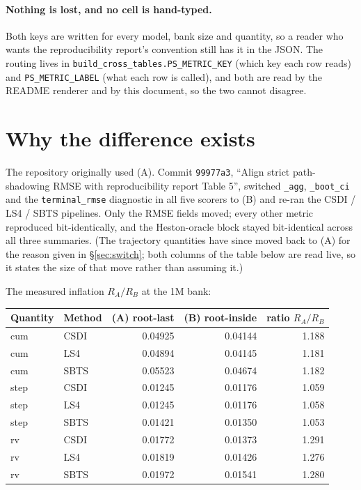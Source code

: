 \documentclass[11pt,a4paper]{article}
\begin{document}
\paragraph{Nothing is lost, and no cell is hand-typed.} Both keys are written for
every model, bank size and quantity, so a reader who wants the reproducibility
report's convention still has it in the JSON. The routing lives in
\texttt{build\_cross\_tables.PS\_METRIC\_KEY} (which key each row reads) and
\texttt{PS\_METRIC\_LABEL} (what each row is called), and both are read by the
README renderer and by this document, so the two cannot disagree.


\section{Why the difference exists}

The repository originally used (A). Commit \texttt{99977a3}, ``Align strict
path-shadowing RMSE with reproducibility report Table 5'', switched
\texttt{\_agg}, \texttt{\_boot\_ci} and the \texttt{terminal\_rmse} diagnostic
in all five scorers to (B) and re-ran the CSDI / LS4 / SBTS pipelines. Only the
RMSE fields moved; every other metric reproduced bit-identically, and the
Heston-oracle block stayed bit-identical across all three summaries.
(The trajectory quantities have since moved back to (A) for the reason given in
\S\ref{sec:switch}; both columns of the table below are read live, so it states
the size of that move rather than assuming it.)

The measured inflation $R_A/R_B$ at the 1M bank:

\begin{center}
\begin{tabular}{llrrr}
\toprule
Quantity & Method & (A) root-last & (B) root-inside & ratio $R_A/R_B$ \\
\midrule
cum & CSDI & 0.04925 & 0.04144 & 1.188 \\
cum & LS4 & 0.04894 & 0.04145 & 1.181 \\
cum & SBTS & 0.05523 & 0.04674 & 1.182 \\
step & CSDI & 0.01245 & 0.01176 & 1.059 \\
step & LS4 & 0.01245 & 0.01176 & 1.058 \\
step & SBTS & 0.01421 & 0.01350 & 1.053 \\
rv & CSDI & 0.01772 & 0.01373 & 1.291 \\
rv & LS4 & 0.01819 & 0.01426 & 1.276 \\
rv & SBTS & 0.01972 & 0.01541 & 1.280 \\
\bottomrule
\end{tabular}
\end{center}
\end{document}

